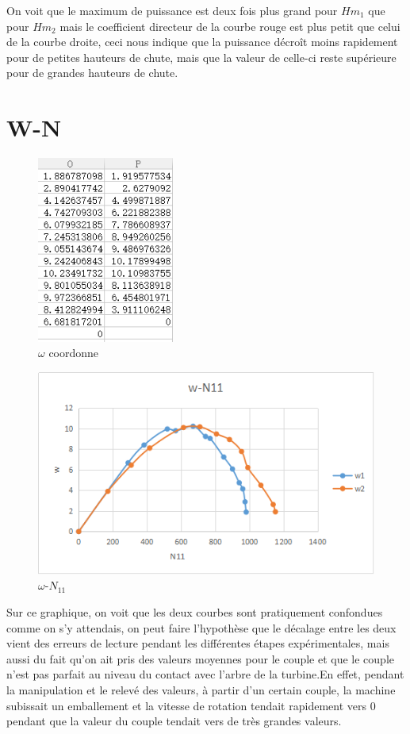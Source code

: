 \documentclass[a4paper,10pt]{report} %
\begin{document}
On voit que le maximum de puissance est deux fois plus grand pour $Hm_1$ que pour $Hm_2$ mais le coefficient directeur de la courbe rouge est plus petit que celui de la courbe droite, ceci nous indique que la puissance décroît moins rapidement pour de petites hauteurs de chute, mais que la valeur de celle-ci reste supérieure pour de grandes hauteurs de chute.\\

\section{W-N}

\begin{figure}[h!]
\centering
\includegraphics[width=0.4\textwidth]{fig/figure9.png}
\caption{$\omega$ coordonne}
\end{figure}\begin{figure}[h!]
\centering
\includegraphics[width=1.0\textwidth]{fig/figure10.png}
\caption{$\omega$-$N_{11}$}
\end{figure}
Sur ce graphique, on voit que les deux courbes sont pratiquement confondues comme on s'y attendais, on peut faire l'hypothèse que le décalage entre les deux vient des erreurs de lecture pendant les différentes étapes expérimentales, mais aussi du fait qu'on ait pris des valeurs moyennes pour le couple et que le couple n'est pas parfait au niveau du contact avec l'arbre de la turbine.En effet, pendant la manipulation et le relevé des valeurs, à partir d'un certain couple, la machine subissait un emballement et la vitesse de rotation tendait rapidement vers 0 pendant que la valeur du couple tendait vers de très grandes valeurs.\\
\end{document}
